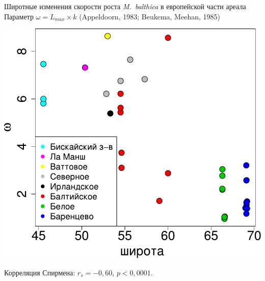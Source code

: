 \documentclass{beamer}
\begin{document}
\begin{frame}{Широтные изменения скорости роста {\it M.~balthica} в европейской части ареала}
{\footnotesize Параметр $\omega = L_{max} \times k$ (Appeldoorn, 1983; Beukema, Meehan, 1985)}
		\begin{center}
			\includegraphics[height=.62\textheight]{./long_vs_omega_big1.pdf}
		\end{center}
{\small Корреляция Спирмена: $r_{s} = -0,60$, $p < 0,0001$.}

\end{frame}
\end{document}
